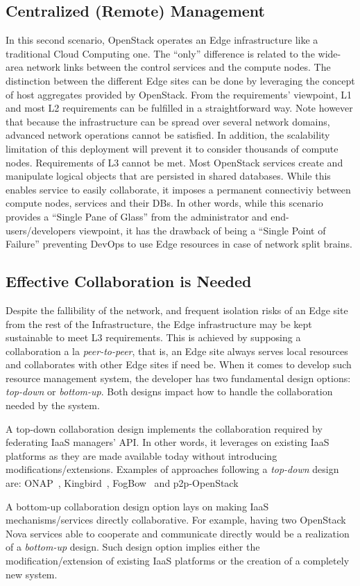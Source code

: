 \subsection{Centralized (Remote) Management}
\label{subsec:centralized_os}
In this second scenario, OpenStack operates an Edge infrastructure
like a traditional Cloud Computing one. The ``only'' difference is
related to the wide-area network links between the control services
and the compute nodes. The distinction between the different Edge
sites can be done by leveraging the concept of host aggregates
provided by OpenStack.
%
From the requirements' viewpoint, L1 and most L2 requirements can be
fulfilled in a straightforward way. Note however that because the
infrastructure can be spread over several network domains, advanced
network operations cannot be satisfied. In addition, the scalability
limitation of this deployment will prevent it to consider thousands of
compute nodes.
%
Requirements of L3 cannot be met. Most OpenStack services create and
manipulate logical objects that are persisted in shared databases.
While this enables service to easily collaborate, it imposes a
permanent connectiviy between compute nodes, services and their DBs.
In other words, while this scenario provides a ``Single Pane of
Glass'' from the administrator and end-users/developers viewpoint, it
has the drawback of being a ``Single Point of Failure'' preventing
DevOps to use Edge resources in case of network split brains.

\subsection{Effective Collaboration is Needed}
Despite the fallibility of the network, and frequent isolation risks
of an Edge site from the rest of the Infrastructure, the Edge
infrastructure may be kept sustainable to meet L3 requirements. This
is achieved by supposing a collaboration a la \emph{peer-to-peer},
that is, an Edge site always serves local resources and collaborates
with other Edge sites if need be. When it comes to develop such
resource management system, the developer has two fundamental design
options: \emph{top-down} or \emph{bottom-up}. Both designs impact how
to handle the collaboration needed by the system.

A top-down collaboration design implements the collaboration required by
federating IaaS managers' API. In other words, it leverages on existing IaaS platforms as they are made available today without introducing modifications/extensions. Examples of approaches following a \emph{top-down} design are: ONAP~\cite{onap}, Kingbird~\cite{kingbird}, FogBow~\cite{brasileiro2016fogbow} and p2p-OpenStack~\cite{ericsson-p2p}

A bottom-up collaboration design option lays on making IaaS mechanisms/services directly collaborative. For example, having two OpenStack Nova services able to cooperate and communicate directly would be a realization of a \emph{bottom-up} design. Such design option implies either the modification/extension of existing IaaS platforms or the creation of a completely new system.
